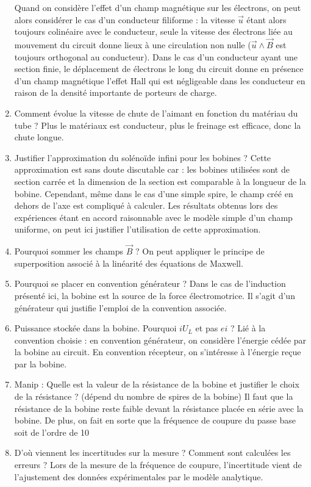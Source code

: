 \begin{enumerate}
Quand on considère l'effet d'un champ magnétique sur les électrons, on peut alors considérer le cas d'un conducteur filiforme : la vitesse $\overrightarrow{u}$ étant alors toujours colinéaire avec le conducteur, seule la vitesse des électrons liée au mouvement du circuit donne lieux à une circulation non nulle ($\overrightarrow{u}\wedge\overrightarrow{B}$ est toujours orthogonal au conducteur).
Dans le cas d'un conducteur ayant une section finie, le déplacement de électrons le long du circuit donne en présence d'un champ magnétique l'effet Hall qui est négligeable dans les conducteur en raison de la densité importante de porteurs de charge.
\item Comment évolue la vitesse de chute de l'aimant en fonction du matériau du tube ? Plus le matériaux est conducteur, plus le freinage est efficace, donc la chute longue.
\item Justifier l'approximation du solénoïde infini pour les bobines ?
Cette approximation est sans doute discutable car : les bobines utilisées sont de section carrée et la dimension de la section est comparable à la longueur de la bobine.
Cependant, même dans le cas d'une simple spire, le champ créé en dehors de l'axe est compliqué à calculer.
Les résultats obtenus lors des expériences étant en accord raisonnable avec le modèle simple d'un champ uniforme, on peut ici justifier l'utilisation de cette approximation.
\item Pourquoi sommer les champs $\overrightarrow{B}$ ? On peut appliquer le principe de superposition associé à la linéarité des équations de Maxwell.
\item Pourquoi se placer en convention générateur ? Dans le cas de l'induction présenté ici, la bobine est la source de la force électromotrice.
Il s'agit d'un générateur qui justifie l'emploi de la convention associée. 
\item Puissance stockée dans la bobine. Pourquoi $iU_L$ et pas $ei$ ? Lié à la convention choisie : en convention générateur, on considère l'énergie cédée par la bobine au circuit.
En convention récepteur, on s'intéresse à l'énergie reçue par la bobine.
\item Manip : Quelle est la valeur de la résistance de la bobine et justifier le choix de la résistance ?
(dépend du nombre de spires de la bobine) Il faut que la résistance de la bobine reste faible devant la résistance placée en série avec la bobine.
De plus, on fait en sorte que la fréquence de coupure du passe base soit de l'ordre de \unit{10}{\kilo\hertz} 
\item D'où viennent les incertitudes sur la mesure ? Comment sont calculées les erreurs ? Lors de la mesure de la fréquence de coupure, l'incertitude vient de l'ajustement des données expérimentales par le modèle analytique.

\end{enumerate}
